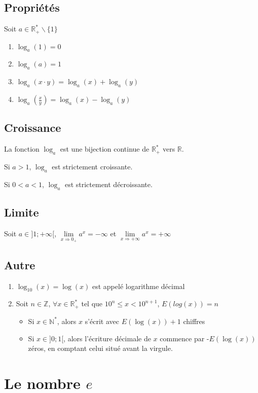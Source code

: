 \documentclass[12pt,a4paper]{report}
\begin{document}
	\subsection*{Propriétés}
	Soit $a \in \mathbb{R}_{+}^{*}\backslash \{1\}$
	\begin{enumerate}
		\item $\log_{a}(1)=0$
		\item $\log_{a}(a)=1$
		\item $\log_{a}(x\cdot y)=\log_{a}(x)+\log_{a}(y) $
		\item $\log_{a}(\frac{x}{y})=\log_{a}(x)-\log_{a}(y)$
	\end{enumerate}
	\subsection*{Croissance}
	La fonction $\log_{a}$ est une bijection continue de $\mathbb{R}_{+}^{*}$ vers $\mathbb{R}$.
	
	Si $a>1$, $\log_{a}$ est strictement croissante.
	
	Si $0<a<1$, $\log_{a}$ est strictement décroissante.
	\subsection*{Limite}
	Soit $a \in ]1;+\infty[$,\hspace{0.5cm} $\lim\limits_{x \Rightarrow 0_{+}} a^x=-\infty$ \hspace{0.5cm} et \hspace{0.5cm} $\lim\limits_{x \Rightarrow +\infty} a^x=+\infty$
	\subsection*{Autre}
	\begin{enumerate}
		\item $\log_{10}(x)=\log(x)$ est appelé logarithme décimal
		\item Soit $n \in \mathbb{Z}$, $\forall x \in \mathbb{R}_{+}^{*}$ tel que $10^n \leqslant x < 10^{n+1}$, $E(log(x))=n$
		\begin{itemize}
			\item Si $x \in \mathbb{N}^{*}$, alors $x$ s'écrit avec $E(\log(x))+1$ chiffres
			\item Si $x \in ]0;1[$, alors l'écriture décimale de $x$ commence par -$E(\log(x))$ zéros, en comptant celui situé avant la virgule.
		\end{itemize}
	\end{enumerate}
	\section*{Le nombre $e$}
	
\end{document}
